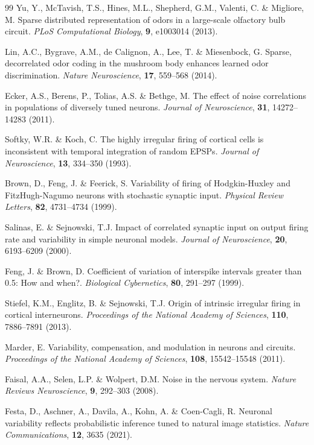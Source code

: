 \begin{thebibliography}{99}
 Yu, Y., McTavish, T.S., Hines, M.L., Shepherd, G.M., Valenti, C. \& Migliore, M. Sparse distributed representation of odors in a large-scale olfactory bulb circuit. \emph{PLoS Computational Biology}, \textbf{9}, e1003014 (2013).

 Lin, A.C., Bygrave, A.M., de Calignon, A., Lee, T. \& Miesenbock, G. Sparse, decorrelated odor coding in the mushroom body enhances learned odor discrimination. \emph{Nature Neuroscience}, \textbf{17}, 559--568 (2014).

 Ecker, A.S., Berens, P., Tolias, A.S. \& Bethge, M. The effect of noise correlations in populations of diversely tuned neurons. \emph{Journal of Neuroscience}, \textbf{31}, 14272--14283 (2011).

 Softky, W.R. \& Koch, C. The highly irregular firing of cortical cells is inconsistent with temporal integration of random EPSPs. \emph{Journal of Neuroscience}, \textbf{13}, 334--350 (1993).

 Brown, D., Feng, J. \& Feerick, S. Variability of firing of Hodgkin-Huxley and FitzHugh-Nagumo neurons with stochastic synaptic input. \emph{Physical Review Letters}, \textbf{82}, 4731--4734 (1999).

 Salinas, E. \& Sejnowski, T.J. Impact of correlated synaptic input on output firing rate and variability in simple neuronal models. \emph{Journal of Neuroscience}, \textbf{20}, 6193--6209 (2000).

 Feng, J. \& Brown, D. Coefficient of variation of interspike intervals greater than 0.5: How and when?. \emph{Biological Cybernetics}, \textbf{80}, 291--297 (1999).

 Stiefel, K.M., Englitz, B. \& Sejnowski, T.J. Origin of intrinsic irregular firing in cortical interneurons. \emph{Proceedings of the National Academy of Sciences}, \textbf{110}, 7886--7891 (2013).

 Marder, E. Variability, compensation, and modulation in neurons and circuits. \emph{Proceedings of the National Academy of Sciences}, \textbf{108}, 15542--15548 (2011).

 Faisal, A.A., Selen, L.P. \& Wolpert, D.M. Noise in the nervous system. \emph{Nature Reviews Neuroscience}, \textbf{9}, 292--303 (2008).

 Festa, D., Aschner, A., Davila, A., Kohn, A. \& Coen-Cagli, R. Neuronal variability reflects probabilistic inference tuned to natural image statistics. \emph{Nature Communications}, \textbf{12}, 3635 (2021).


\end{thebibliography}
